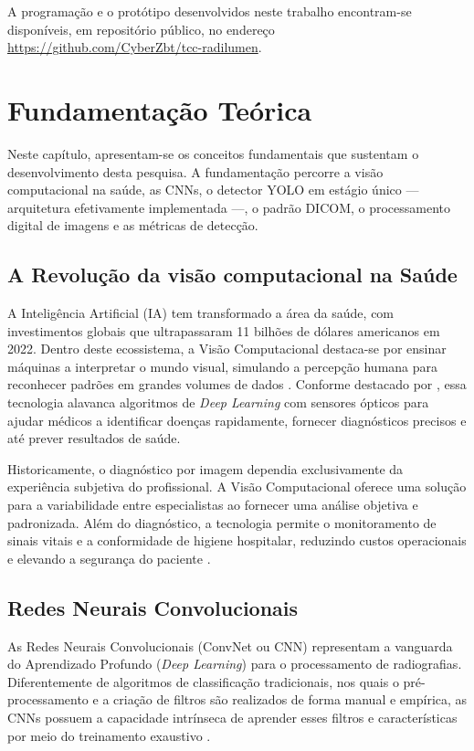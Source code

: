 \documentclass[12pt,oneside,a4paper,chapter=TITLE,section=TITLE,sumario=tradicional]{abntex2}
\begin{document}
A programação e o protótipo desenvolvidos neste trabalho encontram-se disponíveis, em repositório público, no endereço \url{https://github.com/CyberZbt/tcc-radilumen}.

\chapter{Fundamentação Teórica}
\label{cap:fundamentacao-teorica}

Neste capítulo, apresentam-se os conceitos fundamentais que sustentam o desenvolvimento desta pesquisa. A fundamentação percorre a visão computacional na saúde, as CNNs, o detector YOLO em estágio único --- arquitetura efetivamente implementada ---, o padrão DICOM, o processamento digital de imagens e as métricas de detecção.

\section{A Revolução da visão computacional na Saúde}
A Inteligência Artificial (IA) tem transformado a área da saúde, com investimentos globais que ultrapassaram 11 bilhões de dólares americanos em 2022. Dentro deste ecossistema, a Visão Computacional destaca-se por ensinar máquinas a interpretar o mundo visual, simulando a percepção humana para reconhecer padrões em grandes volumes de dados \cite{venturus2024}. Conforme destacado por , essa tecnologia alavanca algoritmos de \textit{Deep Learning} com sensores ópticos para ajudar médicos a identificar doenças rapidamente, fornecer diagnósticos precisos e até prever resultados de saúde.

Historicamente, o diagnóstico por imagem dependia exclusivamente da experiência subjetiva do profissional. A Visão Computacional oferece uma solução para a variabilidade entre especialistas ao fornecer uma análise objetiva e padronizada. Além do diagnóstico, a tecnologia permite o monitoramento de sinais vitais e a conformidade de higiene hospitalar, reduzindo custos operacionais e elevando a segurança do paciente \cite{viso2024,venturus2024}.

\section{Redes Neurais Convolucionais}

As Redes Neurais Convolucionais (ConvNet ou CNN) representam a vanguarda do Aprendizado Profundo (\textit{Deep Learning}) para o processamento de radiografias. Diferentemente de algoritmos de classificação tradicionais, nos quais o pré-processamento e a criação de filtros são realizados de forma manual e empírica, as CNNs possuem a capacidade intrínseca de aprender esses filtros e características por meio do treinamento exaustivo \cite{deeplearningbook2024,ibm2024}.
\end{document}
